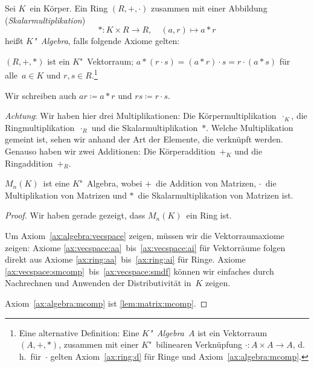 \documentclass[a4paper]{article}
\begin{document}
\begin{axiom}[Algebra]
    Sei $K$~ein Körper. Ein Ring $(R,+,\cdot)$ zusammen mit einer Abbildung (\emph{Skalarmultiplikation})
    \begin{equation*}
        *\colon K\times R \to R,\quad (a,r) \mapsto a*r
    \end{equation*}
    heißt \emph{$K$"~Algebra}, falls folgende Axiome gelten:
    \begin{enumerate}[widest=(AL0), leftmargin=*]
         $(R,+,*)$ ist ein $K$"~Vektorraum;\label{ax:algebra:vecspace}
         $a*(r\cdot s) = (a*r)\cdot s = r\cdot(a*s)$ für alle~$a \in K$ und $r,s \in R$.\label{ax:algebra:mcomp}\footnote{Eine alternative Definition: Eine \emph{$K$"~Algebra~$A$} ist ein Vektorraum $(A,+,*)$, zusammen mit einer $K$"~bilinearen Verknüpfung $\cdot\colon A\times A \to A$, d.\,h.\ für~$\cdot$ gelten Axiom~\ref{ax:ring:d} für Ringe und Axiom~\ref{ax:algebra:mcomp}.}
    \end{enumerate}
\end{axiom}

\begin{notation}
    Wir schreiben auch $ar \coloneqq a*r$ und $rs \coloneqq r\cdot s$.
\end{notation}

\emph{Achtung}: Wir haben hier drei Multiplikationen: Die Körpermultiplikation~$\cdot_K$, die Ringmultiplikation~$\cdot_R$ und die Skalarmultiplikation~$*$. Welche Multiplikation gemeint ist, sehen wir anhand der Art der Elemente, die verknüpft werden. Genauso haben wir zwei Additionen: Die Körperaddition~$+_K$ und die Ringaddition~$+_R$.

\begin{lemma}
    $M_n(K)$~ist eine $K$"~Algebra, wobei $+$~die Addition von Matrizen, $\cdot$~die Multiplikation von Matrizen und $*$~die Skalarmultiplikation von Matrizen ist.
\end{lemma}

\begin{proof}
    Wir haben gerade gezeigt, dass $M_n(K)$~ein Ring ist.

    Um Axiom~\ref{ax:algebra:vecspace} zeigen, müssen wir die Vektorraumaxiome zeigen: Axiome \ref{ax:vecspace:aa}~bis~\ref{ax:vecspace:ai} für Vektorräume folgen direkt aus Axiome \ref{ax:ring:aa}~bis~\ref{ax:ring:ai} für Ringe. Axiome \ref{ax:vecspace:smcomp}~bis~\ref{ax:vecspace:smdf} können wir einfaches durch Nachrechnen und Anwenden der Distributivität in~$K$ zeigen.

    Axiom~\ref{ax:algebra:mcomp} ist \cref{lem:matrix:mcomp}.
\end{proof}
\end{document}
